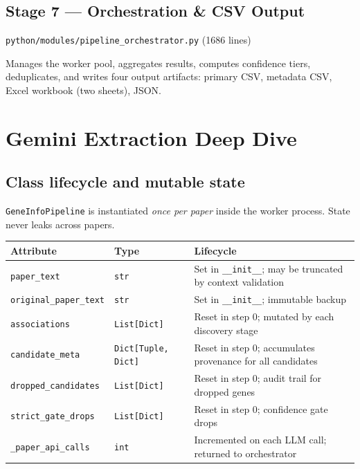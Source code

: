 \documentclass[11pt,a4paper]{article}
\newcommand{\codefile}[1]{\texttt{\small\color{gray}#1}}
\begin{document}
\subsection{Stage 7 --- Orchestration \& CSV Output}
\codefile{python/modules/pipeline\_orchestrator.py} (1686 lines)

Manages the worker pool, aggregates results, computes confidence tiers, deduplicates, and writes four output artifacts: primary CSV, metadata CSV, Excel workbook (two sheets), JSON.

\section{Gemini Extraction Deep Dive}
\label{sec:gemini}

\subsection{Class lifecycle and mutable state}

\texttt{GeneInfoPipeline} is instantiated \textit{once per paper} inside the worker process. State never leaks across papers.

\begin{center}
\begin{tabular}{lll}
\toprule
\textbf{Attribute} & \textbf{Type} & \textbf{Lifecycle} \\
\midrule
\texttt{paper\_text} & \texttt{str} & Set in \texttt{\_\_init\_\_}; may be truncated by context validation \\
\texttt{original\_paper\_text} & \texttt{str} & Set in \texttt{\_\_init\_\_}; immutable backup \\
\texttt{associations} & \texttt{List[Dict]} & Reset in step 0; mutated by each discovery stage \\
\texttt{candidate\_meta} & \texttt{Dict[Tuple, Dict]} & Reset in step 0; accumulates provenance for all candidates \\
\texttt{dropped\_candidates} & \texttt{List[Dict]} & Reset in step 0; audit trail for dropped genes \\
\texttt{strict\_gate\_drops} & \texttt{List[Dict]} & Reset in step 0; confidence gate drops \\
\texttt{\_paper\_api\_calls} & \texttt{int} & Incremented on each LLM call; returned to orchestrator \\
\bottomrule
\end{tabular}
\end{center}
\end{document}
